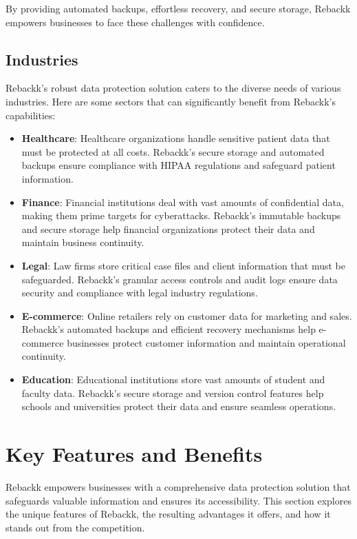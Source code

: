 \documentclass[12pt]{article}
\begin{document}
By providing automated backups, effortless recovery, and secure storage, Rebackk empowers businesses to face these challenges with confidence.

\subsection{Industries}
Rebackk's robust data protection solution caters to the diverse needs of various industries. Here are some sectors that can significantly benefit from Rebackk's capabilities:

\begin{itemize}
    \item \textbf{Healthcare}: Healthcare organizations handle sensitive patient data that must be protected at all costs. Rebackk's secure storage and automated backups ensure compliance with HIPAA regulations and safeguard patient information.
    \item \textbf{Finance}: Financial institutions deal with vast amounts of confidential data, making them prime targets for cyberattacks. Rebackk's immutable backups and secure storage help financial organizations protect their data and maintain business continuity.
    \item \textbf{Legal}: Law firms store critical case files and client information that must be safeguarded. Rebackk's granular access controls and audit logs ensure data security and compliance with legal industry regulations.
    \item \textbf{E-commerce}: Online retailers rely on customer data for marketing and sales. Rebackk's automated backups and efficient recovery mechanisms help e-commerce businesses protect customer information and maintain operational continuity.
    \item \textbf{Education}: Educational institutions store vast amounts of student and faculty data. Rebackk's secure storage and version control features help schools and universities protect their data and ensure seamless operations.
\end{itemize}

\section{Key Features and Benefits}
Rebackk empowers businesses with a comprehensive data protection solution that safeguards valuable information and ensures its accessibility. This section explores the unique features of Rebackk, the resulting advantages it offers, and how it stands out from the competition.
\end{document}

